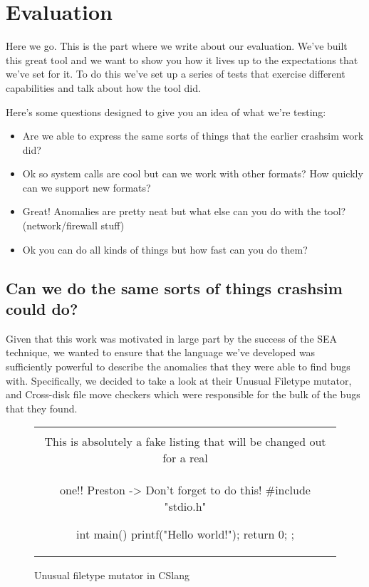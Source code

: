 \section{Evaluation}
\label{SEC:evaluation}

Here we go.  This is the part where we write about our evaluation.  We've
built this great tool and we want to show you how it lives up to the
expectations that we've set for it.  To do this we've set up a series of
tests that exercise different capabilities and talk about how the tool did.

Here's some questions designed to give you an idea of what we're testing:


\begin{itemize}

  \item{Are we able to express the same sorts of things that the earlier
    crashsim work did?}

  \item{Ok so system calls are cool but can we work with other formats?
    How quickly can we support new formats?}

  \item{Great! Anomalies are pretty neat but what else can you do with the
    tool? (network/firewall stuff)}

  \item{Ok you can do all kinds of things but how fast can you do them?}

\end{itemize}


\subsection{Can we do the same sorts of things crashsim could do?}

Given that this work was motivated
in large part
by the success of the SEA technique,
we wanted to ensure that
the language we've developed
was sufficiently powerful
to describe the anomalies that they were able to find bugs with.
Specifically, we decided to take a look at their Unusual Filetype mutator,
and Cross-disk file move checkers which were responsible for the bulk of
the bugs that they found.

\begin{figure}[H]
\centering
\begin{tabular}{c}
\begin{lstlisting}
\\ This is absolutely a fake listing that will be changed out for a real
\\ one!!  Preston -> Don't forget to do this!
#include "stdio.h"

int main() {
    printf("Hello world!\n");
    return 0;
};
\end{lstlisting}
\end{tabular}
\caption{Unusual filetype mutator in CSlang}
\label{lst:UnusualFiletypeCSlang}
\end{figure}

